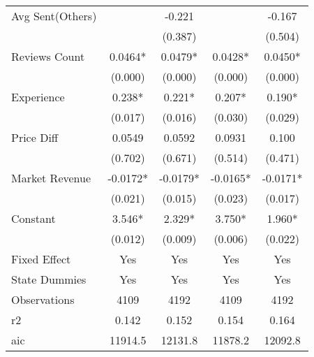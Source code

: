 \begin{table}[]
\begin{tabular}{@{}lcccc@{}}
Avg Sent(Others)                                       &                     & -0.221     &            & -0.167     \\
                                                       &                     & (0.387)    &            & (0.504)    \\
Reviews Count                                          & 0.0464*             & 0.0479*    & 0.0428*    & 0.0450*    \\
                                                       & (0.000)             & (0.000)    & (0.000)    & (0.000)    \\
Experience                                             & 0.238*              & 0.221*     & 0.207*     & 0.190*     \\
                                                       & (0.017)             & (0.016)    & (0.030)    & (0.029)    \\
Price Diff                                             & 0.0549              & 0.0592     & 0.0931     & 0.100      \\
                                                       & (0.702)             & (0.671)    & (0.514)    & (0.471)    \\
Market Revenue                                         & -0.0172*            & -0.0179*   & -0.0165*   & -0.0171*   \\
                                                       & (0.021)             & (0.015)    & (0.023)    & (0.017)    \\
Constant                                               & 3.546*              & 2.329*     & 3.750*     & 1.960*     \\
                                                       & (0.012)             & (0.009)    & (0.006)    & (0.022)    \\
Fixed Effect                                           & Yes                 & Yes        & Yes        & Yes        \\
State Dummies                                          & Yes                 & Yes        & Yes        & Yes        \\
Observations                                           & 4109                & 4192       & 4109       & 4192       \\
r2                                                     & 0.142              & 0.152    & 0.154     & 0.164     \\
aic                                                    & 11914.5             & 12131.8    & 11878.2    & 12092.8    \\

\end{tabular}
\end{table}
